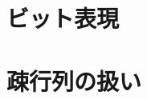 \documentclass[10pt,dvipdfmx]{beamer}
\begin{document}
\section{ビット表現}


\section{疎行列の扱い}

\end{document}
